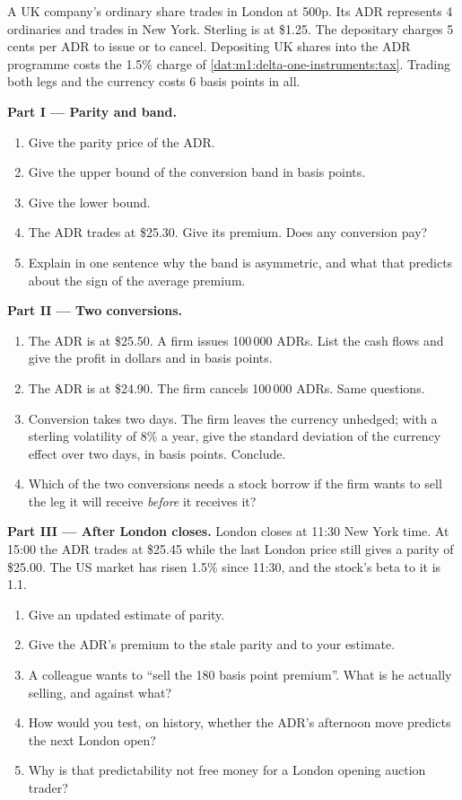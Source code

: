 \begin{problem}\label{pb:m1:delta-one-instruments:1}
A UK company's ordinary share trades in London at 500p. Its ADR represents 4
ordinaries and trades in New York. Sterling is at \$1.25. The depositary
charges 5 cents per ADR to issue or to cancel. Depositing UK shares into the
ADR programme costs the 1.5\% charge of
\cref{dat:m1:delta-one-instruments:tax}. Trading both legs and the currency
costs 6 basis points in all.

\medskip\noindent\textbf{Part I --- Parity and band.}
\begin{enumerate}
\item Give the parity price of the ADR.
\item Give the upper bound of the conversion band in basis points.
\item Give the lower bound.
\item The ADR trades at \$25.30. Give its premium. Does any conversion pay?
\item Explain in one sentence why the band is asymmetric, and what that
predicts about the sign of the average premium.
\end{enumerate}

\medskip\noindent\textbf{Part II --- Two conversions.}
\begin{enumerate}[resume]
\item The ADR is at \$25.50. A firm issues 100\,000 ADRs. List the cash flows
and give the profit in dollars and in basis points.
\item The ADR is at \$24.90. The firm cancels 100\,000 ADRs. Same questions.
\item Conversion takes two days. The firm leaves the currency unhedged; with
a sterling volatility of 8\% a year, give the standard deviation of the
currency effect over two days, in basis points. Conclude.
\item Which of the two conversions needs a stock borrow if the firm wants to
sell the leg it will receive \emph{before} it receives it?
\end{enumerate}

\medskip\noindent\textbf{Part III --- After London closes.}
London closes at 11:30 New York time. At 15:00 the ADR trades at \$25.45
while the last London price still gives a parity of \$25.00. The US market
has risen 1.5\% since 11:30, and the stock's beta to it is 1.1.
\begin{enumerate}[resume]
\item Give an updated estimate of parity.
\item Give the ADR's premium to the stale parity and to your estimate.
\item A colleague wants to ``sell the 180 basis point premium''. What is he
actually selling, and against what?
\item How would you test, on history, whether the ADR's afternoon move
predicts the next London open?
\item Why is that predictability not free money for a London opening
auction trader?
\end{enumerate}


\end{problem}
